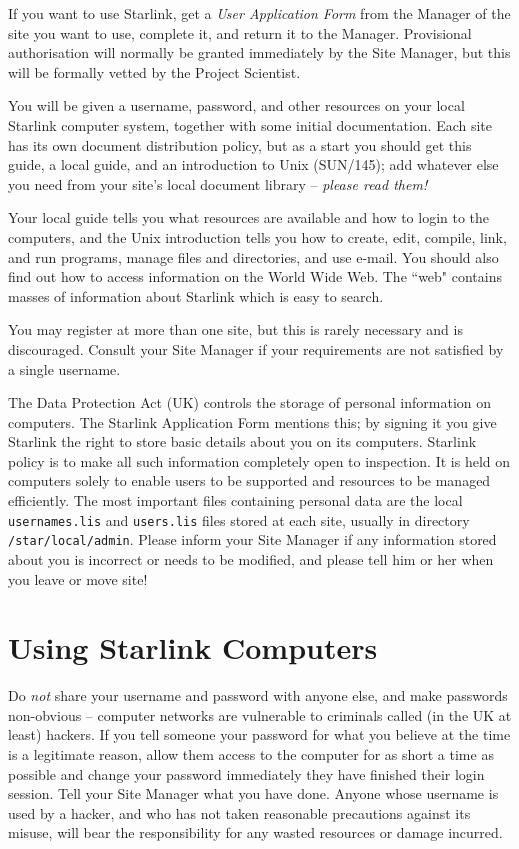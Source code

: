 \documentclass[twoside]{article}
\newcommand{\xref}[3]{#1}
\begin{document}
If you want to use Starlink, get a {\em User Application Form}\/ from the
Manager of the site you want to use, complete it, and return it to the Manager.
Provisional authorisation will normally be granted immediately by the Site
Manager, but this will be formally vetted by the Project Scientist.

You will be given a username, password, and other resources on your local
Starlink computer system, together with some initial documentation.
Each site has its own document distribution policy, but as a start
you should get this guide, a local guide, and an introduction to Unix
(\xref{SUN/145}{sun145}{});
add whatever else you need from your site's local document library --
{\em please read them!}

Your local guide tells you what resources are available and how to login to
the computers, and the Unix introduction tells you how to create, edit,
compile, link, and run programs, manage files and directories, and use e-mail.
You should also find out how to access information on the World Wide Web.
The ``web" contains masses of information about Starlink which is easy to
search.

You may register at more than one site, but this is rarely necessary and
is discouraged.
Consult your Site Manager if your requirements are not satisfied by a single
username.

The Data Protection Act (UK) controls the storage of personal information on
computers.
The Starlink Application Form mentions this; by signing it
you give Starlink the right to store basic details about you on its computers.
Starlink policy is to make all such information completely open to inspection.
It is held on computers solely to enable users to be supported and resources
to be managed efficiently.
The most important files containing personal data are the local
{\tt usernames.lis} and {\tt users.lis} files stored at each site,
usually in directory {\tt /star/local/admin}.
Please inform your Site Manager if any information stored about you is
incorrect or needs to be modified, and please tell him or her when you leave
or move site!

\newpage

\section{Using Starlink Computers}

Do {\em not}\/ share your username and password with anyone else, and make
passwords non-obvious -- computer networks are vulnerable to criminals called
(in the UK at least) hackers.
If you tell someone your password for what you believe at the time is a
legitimate reason, allow them access to the computer for as short a time as
possible and change your password immediately they have finished their login
session.
Tell your Site Manager what you have done.
Anyone whose username is used by a hacker, and who has not taken reasonable
precautions against its misuse, will bear the responsibility for any wasted
resources or damage incurred.
\end{document}
